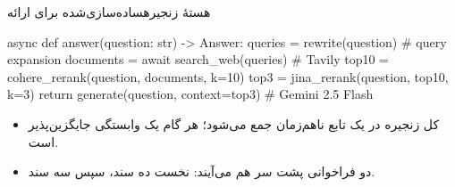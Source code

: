 \begin{frame}[fragile]{هستهٔ زنجیره}{ساده‌سازی‌شده برای ارائه}
\begin{PTcode}[language=Python]
async def answer(question: str) -> Answer:
    queries   = rewrite(question)              # query expansion
    documents = await search_web(queries)      # Tavily
    top10     = cohere_rerank(question, documents, k=10)
    top3      = jina_rerank(question, top10,   k=3)
    return generate(question, context=top3)    # Gemini 2.5 Flash
\end{PTcode}

  \begin{itemize}
    \item کل زنجیره در یک تابع ناهم‌زمان جمع می‌شود؛ هر گام یک وابستگی
          جایگزین‌پذیر است.
    \item دو فراخوانی  پشت سر هم می‌آیند: نخست ده سند، سپس سه سند.
  \end{itemize}
\end{frame}
